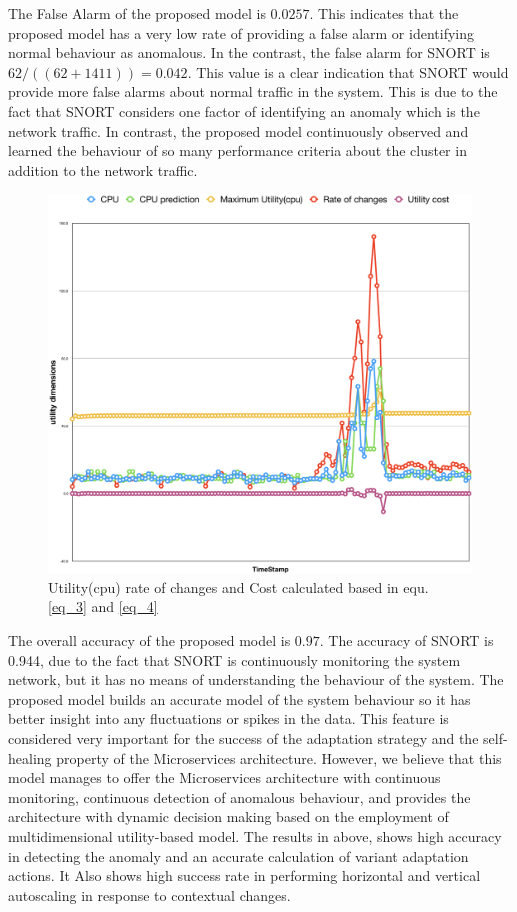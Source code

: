 \documentclass[sigconf]{acmart}
\begin{document}
The False Alarm of the proposed model  is $0.0257$. This indicates that the proposed model has a very low rate of providing a false alarm or identifying normal behaviour as anomalous. In the contrast, the false alarm for SNORT is $62/((62+1411))=0.042$. This value is a clear indication that SNORT would provide more false alarms about normal traffic in the system. This is due to the fact that SNORT considers one factor of identifying an anomaly which is the network traffic. In contrast, the proposed model continuously observed and learned the behaviour of so many performance criteria about the cluster in addition to the network traffic. 

\begin{figure}[ht!] 
\includegraphics[scale=0.22]{changes}
\caption{Utility(cpu) rate of changes and Cost calculated based in equ. \ref{eq_3} and \ref{eq_4}}
\label{fig_changes}
\end{figure}


The overall accuracy of the proposed model is $0.97$. The accuracy of SNORT is 0.944, due to the fact that SNORT is continuously monitoring the system network, but it has no means of understanding the behaviour of the system. The proposed model builds an accurate model of the system behaviour so it has better insight into any fluctuations or spikes in the data. This feature is considered very important for the success of the adaptation strategy and the self-healing property of the Microservices architecture. However, we believe that this model manages to offer the Microservices architecture with continuous monitoring, continuous detection of anomalous behaviour, and provides the architecture with dynamic decision making based on the employment of multidimensional utility-based model. The results in above, shows high accuracy in detecting the anomaly and an accurate calculation of variant adaptation actions. It Also shows high success rate in performing horizontal and vertical autoscaling in response to contextual changes. 
\end{document}
